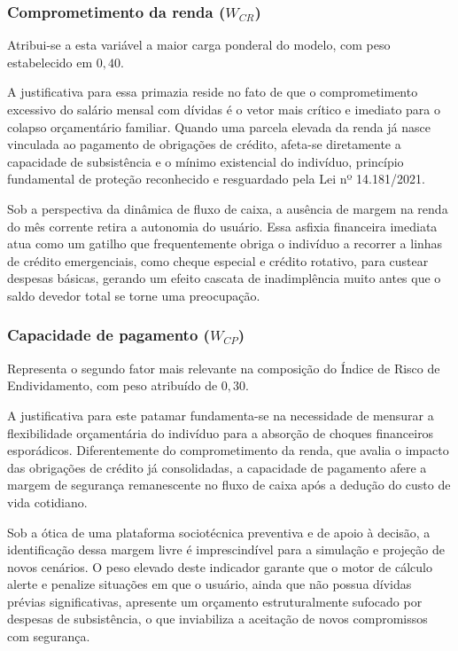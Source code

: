 \documentclass[portuguese]{sbc2025}%
\begin{document}
\subsubsection{Comprometimento da renda ($W_{CR}$)}

Atribui-se a esta variável a maior carga ponderal do modelo, com peso estabelecido em $0{,}40$.

A justificativa para essa primazia reside no fato de que o comprometimento excessivo do salário mensal com dívidas é o vetor mais crítico e imediato para o colapso orçamentário familiar. Quando uma parcela elevada da renda já nasce vinculada ao pagamento de obrigações de crédito, afeta-se diretamente a capacidade de subsistência e o mínimo existencial do indivíduo, princípio fundamental de proteção reconhecido e resguardado pela Lei nº 14.181/2021.

Sob a perspectiva da dinâmica de fluxo de caixa, a ausência de margem na renda do mês corrente retira a autonomia do usuário. Essa asfixia financeira imediata atua como um gatilho que frequentemente obriga o indivíduo a recorrer a linhas de crédito emergenciais, como cheque especial e crédito rotativo, para custear despesas básicas, gerando um efeito cascata de inadimplência muito antes que o saldo devedor total se torne uma preocupação.

\subsubsection{Capacidade de pagamento ($W_{CP}$)}

Representa o segundo fator mais relevante na composição do Índice de Risco de Endividamento, com peso atribuído de $0{,}30$.

A justificativa para este patamar fundamenta-se na necessidade de mensurar a flexibilidade orçamentária do indivíduo para a absorção de choques financeiros esporádicos. Diferentemente do comprometimento da renda, que avalia o impacto das obrigações de crédito já consolidadas, a capacidade de pagamento afere a margem de segurança remanescente no fluxo de caixa após a dedução do custo de vida cotidiano.

Sob a ótica de uma plataforma sociotécnica preventiva e de apoio à decisão, a identificação dessa margem livre é imprescindível para a simulação e projeção de novos cenários. O peso elevado deste indicador garante que o motor de cálculo alerte e penalize situações em que o usuário, ainda que não possua dívidas prévias significativas, apresente um orçamento estruturalmente sufocado por despesas de subsistência, o que inviabiliza a aceitação de novos compromissos com segurança.
\end{document}
